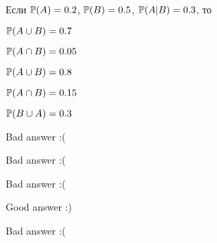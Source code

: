 
\begin{question}
Если \(\P(A)=0.2\), \(\P(B)=0.5\), \(\P(A | B) = 0.3\), то
\begin{answerlist}
  \item \(\P(A \cup B) = 0.7\)
  \item \(\P(A \cap B) = 0.05\)
  \item \(\P(A \cup B) = 0.8\)
  \item \(\P(A \cap B) = 0.15\)
  \item \(\P(B \cup A) = 0.3\)
\end{answerlist}
\end{question}

\begin{solution}
\begin{answerlist}
  \item Bad answer :(
  \item Bad answer :(
  \item Bad answer :(
  \item Good answer :)
  \item Bad answer :(
\end{answerlist}
\end{solution}

